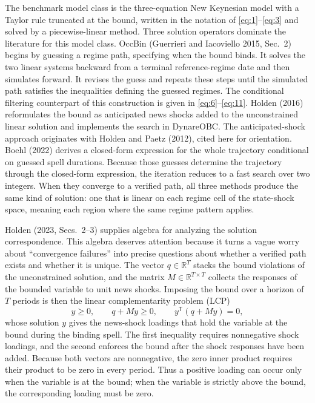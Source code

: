 \documentclass[11pt]{article}
\begin{document}
The benchmark model class is the three-equation New Keynesian model with a
Taylor rule truncated at the bound, written in the notation of
\eqref{eq:1}--\eqref{eq:3} and solved by a piecewise-linear method. Three
solution operators dominate the literature for this model class. OccBin
(Guerrieri and Iacoviello 2015, Sec.~2) begins by guessing a regime
path, specifying when the bound binds. It solves the two linear systems
backward from a terminal reference-regime date and then simulates forward.
It revises the guess and repeats these steps until the simulated path satisfies
the inequalities defining the guessed regimes. The conditional filtering
counterpart of this construction is given in \eqref{eq:6}--\eqref{eq:11}.
Holden (2016) reformulates the bound as anticipated news shocks added
to the unconstrained linear solution and implements the search in DynareOBC.
The anticipated-shock approach originates with Holden and Paetz
(2012), cited here for orientation. Boehl (2022) derives a
closed-form expression for the whole trajectory conditional on guessed spell
durations. Because those guesses determine the trajectory through the
closed-form expression, the iteration reduces to a fast search over two
integers. When they converge to a verified path, all three methods produce the
same kind of solution: one that is linear on each regime cell of the
state-shock space, meaning each region where the same regime pattern applies.

Holden (2023, Secs.~2--3) supplies algebra for analyzing the solution
correspondence. This algebra deserves attention because it turns a vague worry
about ``convergence failures'' into precise questions about whether a verified
path exists and whether it is unique. The vector
$q\in\mathbb R^{T}$ stacks the bound violations of the unconstrained solution,
and the matrix $M\in\mathbb R^{T\times T}$ collects the responses of the bounded variable
to unit news shocks. Imposing the bound over a horizon of
$T$ periods is then the linear complementarity problem (LCP)
\begin{equation}\label{eq:93}
 y\geq0,\qquad q+My\geq0,\qquad y^{\mathsf T}(q+My)=0,
\end{equation}
whose solution $y$ gives the news-shock loadings that hold the
variable at the bound during the binding spell. The first inequality requires
nonnegative shock loadings, and the second enforces the bound after the shock
responses have been added. Because both vectors are nonnegative, the zero
inner product requires their product to be zero in every period. Thus a
positive loading can occur only when the variable is at the bound; when the
variable is strictly above the bound, the corresponding loading must be zero.
\end{document}
